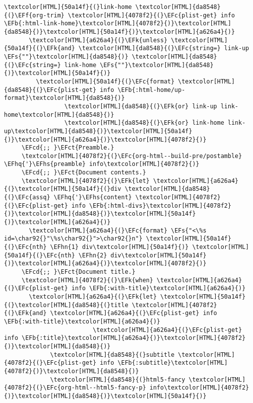 \documentclass{scrartcl}
\newcommand{\EFk}[1]{\textcolor{EFk}{#1}} %
\newcommand{\EFs}[1]{\textcolor{EFs}{#1}} %
\newcommand{\EFb}[1]{\textcolor{EFb}{#1}} %
\newcommand{\EFct}[1]{\textcolor{EFct}{#1}} %
\newcommand{\EFc}[1]{\textcolor{EFc}{#1}} %
\newcommand{\EFf}[1]{\textcolor{EFf}{#1}} %
\newcommand{\EFcd}[1]{\textcolor{EFcd}{#1}} %
\newcommand{\EFhn}[1]{\textcolor{EFhn}{\textbf{#1}}} %
\newcommand{\EFhq}[1]{\textcolor{EFhq}{#1}} %
\newcommand{\EFhs}[1]{\textcolor{EFhs}{#1}} %
\begin{document}
\begin{Code}
\begin{Verbatim}[]
           \textcolor[HTML]{50a14f}{(}link-home \textcolor[HTML]{da8548}{(}\EFf{org-trim} \textcolor[HTML]{4078f2}{(}\EFc{plist-get} info \EFb{:html-link-home}\textcolor[HTML]{4078f2}{)}\textcolor[HTML]{da8548}{)}\textcolor[HTML]{50a14f}{)}\textcolor[HTML]{a626a4}{)}
       \textcolor[HTML]{a626a4}{(}\EFk{unless} \textcolor[HTML]{50a14f}{(}\EFk{and} \textcolor[HTML]{da8548}{(}\EFc{string=} link-up \EFs{""}\textcolor[HTML]{da8548}{)} \textcolor[HTML]{da8548}{(}\EFc{string=} link-home \EFs{""}\textcolor[HTML]{da8548}{)}\textcolor[HTML]{50a14f}{)}
         \textcolor[HTML]{50a14f}{(}\EFc{format} \textcolor[HTML]{da8548}{(}\EFc{plist-get} info \EFb{:html-home/up-format}\textcolor[HTML]{da8548}{)}
                 \textcolor[HTML]{da8548}{(}\EFk{or} link-up link-home\textcolor[HTML]{da8548}{)}
                 \textcolor[HTML]{da8548}{(}\EFk{or} link-home link-up\textcolor[HTML]{da8548}{)}\textcolor[HTML]{50a14f}{)}\textcolor[HTML]{a626a4}{)}\textcolor[HTML]{4078f2}{)}
     \EFcd{;; }\EFct{Preamble.}
     \textcolor[HTML]{4078f2}{(}\EFc{org-html--build-pre/postamble} \EFhq{'}\EFhs{preamble} info\textcolor[HTML]{4078f2}{)}
     \EFcd{;; }\EFct{Document contents.}
     \textcolor[HTML]{4078f2}{(}\EFk{let} \textcolor[HTML]{a626a4}{(}\textcolor[HTML]{50a14f}{(}div \textcolor[HTML]{da8548}{(}\EFc{assq} \EFhq{'}\EFhs{content} \textcolor[HTML]{4078f2}{(}\EFc{plist-get} info \EFb{:html-divs}\textcolor[HTML]{4078f2}{)}\textcolor[HTML]{da8548}{)}\textcolor[HTML]{50a14f}{)}\textcolor[HTML]{a626a4}{)}
       \textcolor[HTML]{a626a4}{(}\EFc{format} \EFs{"<\%s id=\char92{}"\%s\char92{}">\char92{}n"} \textcolor[HTML]{50a14f}{(}\EFc{nth} \EFhn{1} div\textcolor[HTML]{50a14f}{)} \textcolor[HTML]{50a14f}{(}\EFc{nth} \EFhn{2} div\textcolor[HTML]{50a14f}{)}\textcolor[HTML]{a626a4}{)}\textcolor[HTML]{4078f2}{)}
     \EFcd{;; }\EFct{Document title.}
     \textcolor[HTML]{4078f2}{(}\EFk{when} \textcolor[HTML]{a626a4}{(}\EFc{plist-get} info \EFb{:with-title}\textcolor[HTML]{a626a4}{)}
       \textcolor[HTML]{a626a4}{(}\EFk{let} \textcolor[HTML]{50a14f}{(}\textcolor[HTML]{da8548}{(}title \textcolor[HTML]{4078f2}{(}\EFk{and} \textcolor[HTML]{a626a4}{(}\EFc{plist-get} info \EFb{:with-title}\textcolor[HTML]{a626a4}{)}
                         \textcolor[HTML]{a626a4}{(}\EFc{plist-get} info \EFb{:title}\textcolor[HTML]{a626a4}{)}\textcolor[HTML]{4078f2}{)}\textcolor[HTML]{da8548}{)}
             \textcolor[HTML]{da8548}{(}subtitle \textcolor[HTML]{4078f2}{(}\EFc{plist-get} info \EFb{:subtitle}\textcolor[HTML]{4078f2}{)}\textcolor[HTML]{da8548}{)}
             \textcolor[HTML]{da8548}{(}html5-fancy \textcolor[HTML]{4078f2}{(}\EFc{org-html--html5-fancy-p} info\textcolor[HTML]{4078f2}{)}\textcolor[HTML]{da8548}{)}\textcolor[HTML]{50a14f}{)}

\end{Verbatim}
\end{Code}
\end{document}
